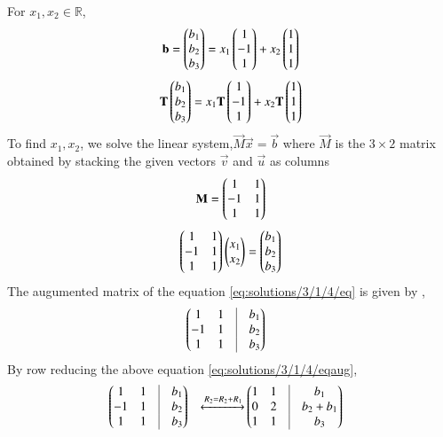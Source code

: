 For $x_1,x_2 \in \mathbb{R}$,
\begin{align}
    \mathbf{b}=\begin{pmatrix}b_1\\b_2\\b_3\end{pmatrix}=x_1\begin{pmatrix}1\\-1\\1\end{pmatrix}+x_2\begin{pmatrix}1\\1\\1\end{pmatrix}
\end{align}
\begin{align}
    \mathbf{T}\begin{pmatrix}b_1\\b_2\\b_3\end{pmatrix}=x_1\mathbf{T}\begin{pmatrix}1\\-1\\1\end{pmatrix}+x_2\mathbf{T}\begin{pmatrix}1\\1\\1\end{pmatrix}\label{eq:solutions/3/1/4/eq1}
\end{align}
To find $x_1,x_2$, we solve the linear system,$\vec{M}\vec{x}=\vec{b}$ where $\vec{M}$ is the $3 \times 2$ matrix obtained by stacking the given vectors $\vec{v}$ and $\vec{u}$ as columns
\begin{align}
    \mathbf{M}=\begin{pmatrix}1 & 1\\-1 & 1 \\ 1 & 1\end{pmatrix}
\end{align}
\begin{align}
\begin{pmatrix}1 & 1\\-1 & 1 \\ 1 & 1\end{pmatrix}\begin{pmatrix}x_1\\x_2\end{pmatrix}=\begin{pmatrix}b_1\\b_2\\b_3\end{pmatrix}\label{eq:solutions/3/1/4/eq}
\end{align}
The augumented matrix of the equation \eqref{eq:solutions/3/1/4/eq} is given by ,
\begin{align}
    &\myvec{1& 1 &\vrule & b_1 \\ -1 & 1 & \vrule& b_2\\ 1 & 1 &\vrule & b_3}\label{eq:solutions/3/1/4/eqaug}
\end{align}
By row reducing the above equation \eqref{eq:solutions/3/1/4/eqaug},
\begin{align}
    &\myvec{1& 1 &\vrule & b_1 \\ -1 & 1 & \vrule& b_2\\ 1 & 1 &\vrule & b_3}&\xleftrightarrow{R_2=R_2+R_1}&\myvec{1& 1 &\vrule & b_1 \\ 0 & 2 & \vrule& b_2+b_1\\ 1 & 1 &\vrule & b_3}
\end{align}
